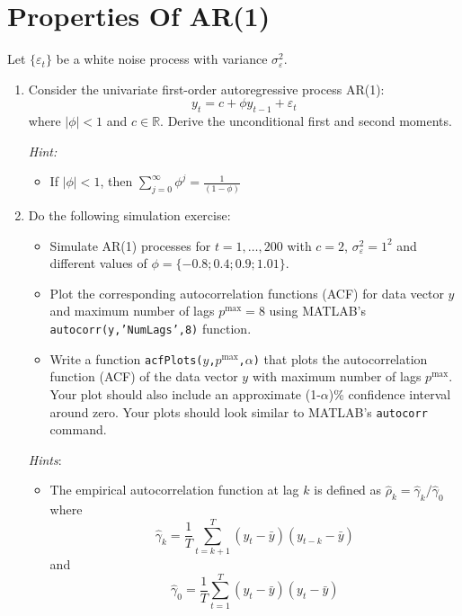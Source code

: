 \section[Properties of AR{(1)}]{Properties Of AR{(1)}\label{ex:PropertiesAR1}}

Let \( \{\varepsilon_t\} \) be a white noise process with variance \(\sigma_\varepsilon^2\).

\begin{enumerate}
\item Consider the univariate first-order autoregressive process AR{(1)}: 
\[y_t = c + \phi y_{t-1} + \varepsilon_{t}\]
where \(|\phi|<1\) and \(c\in \mathbb{R}\).
Derive the unconditional first and second moments.

\emph{Hint:}
\begin{itemize}
\item If \(|\phi|<1\), then \(\sum_{j=0}^{\infty} \phi^j = \frac{1}{(1-\phi)}\)
\end{itemize}

\item Do the following simulation exercise:
\begin{itemize}
\item
Simulate AR{(1)} processes for \(t=1,\ldots,200\) with \(c=2\),
  \(\sigma_\varepsilon^2 = 1^2\) and different values of \( \phi=\{-0.8;0.4;0.9;1.01\} \).

\item Plot the corresponding autocorrelation functions (ACF) for data vector \(y\)
  and maximum number of lags \(p^{\text{max}}=8\) using MATLAB's \texttt{autocorr{(y,{'NumLags'},8)}} function.

\item Write a function \texttt{acfPlots{(\(y\),\(p^{\text{max}}\),\( \alpha \))}}
  that plots the autocorrelation function (ACF) of the data vector \(y\)
  with maximum number of lags \(p^{\text{max}}\).
Your plot should also include an approximate (1-\( \alpha \))\% confidence interval around zero.
Your plots should look similar to MATLAB's \texttt{autocorr} command.
\end{itemize}
	
\emph{Hints}:
\begin{itemize}
\item
The empirical autocorrelation function at lag \(k\) is defined as
  \(\hat{\rho}_k = \hat{\gamma}_k/\hat{\gamma}_0\) where
  \[\hat{\gamma}_k = \frac{1}{T} \sum_{t=k+1}^T (y_t - \bar{y})(y_{t-k}-\bar{y})\]
  and \[\hat{\gamma}_0 = \frac{1}{T} \sum_{t=1}^T (y_t - \bar{y})(y_{t}-\bar{y})\]


\end{itemize}
\end{enumerate}
